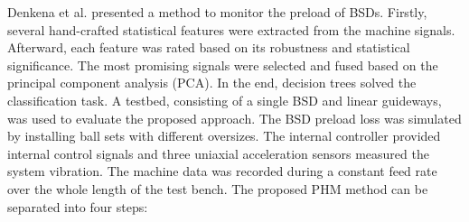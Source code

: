Denkena et al. \cite{Denkena2021} presented a method to monitor the preload of BSDs. Firstly, several hand-crafted statistical features were extracted from the machine signals. Afterward, each feature was rated based on its robustness and statistical significance. The most promising signals were selected and fused based on the principal component analysis (PCA). In the end, decision trees solved the classification task. A testbed, consisting of a single BSD and linear guideways, was used to evaluate the proposed approach. The BSD preload loss was simulated by installing ball sets with different oversizes. The internal controller provided internal control signals and three uniaxial acceleration sensors measured the system vibration. The machine data was recorded during a constant feed rate over the whole length of the test bench. The proposed PHM method can be separated into four steps:


